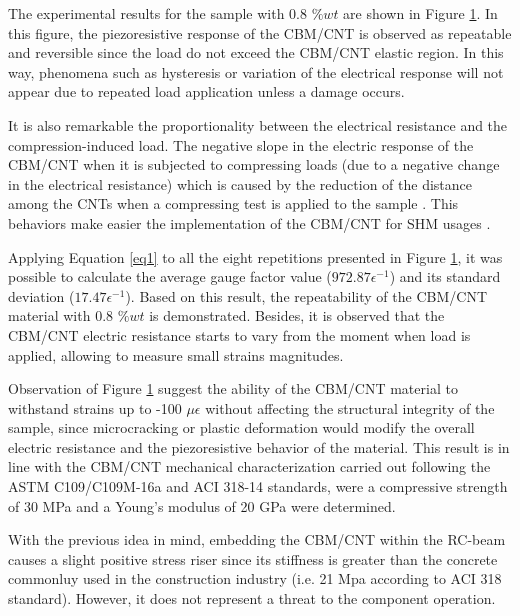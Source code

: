 \documentclass[twocolumn]{bmcart}%
\begin{document}
The experimental results for the sample with 0.8 $\%wt$ are shown in Figure \ref{fig10}. In this figure, the piezoresistive response of the CBM/CNT is observed as repeatable and reversible since the load do not exceed the CBM/CNT elastic region. In this way, phenomena such as hysteresis or variation of the electrical response will not appear due to repeated load application unless a damage occurs.  

It is also remarkable the proportionality between the electrical resistance and the compression-induced load. The negative slope in the electric response of the CBM/CNT when it is subjected to compressing loads (due to a negative change in the electrical resistance) which is caused by the reduction of the distance among the CNTs when a compressing test is applied to the sample \cite{DAlessandro2017}. This behaviors  make easier the implementation of the CBM/CNT for SHM usages \cite{Lagason2016}.


\begin{figure}[h!]
  \caption{
      }
      \label{fig10}
      \end{figure}

Applying Equation \ref{eq1} to all the eight repetitions presented in Figure \ref{fig10}, it was possible to calculate the average gauge factor value ($972.87\epsilon^{-1}$) and its standard deviation  ($17.47 \epsilon^{-1}$). Based on this result, the repeatability of the CBM/CNT material with 0.8 $\%wt$ is demonstrated. Besides, it is observed that the CBM/CNT electric resistance starts to vary from the moment when load is applied, allowing to measure small strains magnitudes.


Observation of Figure \ref{fig10} suggest the ability of the CBM/CNT material to withstand strains up to -100 $\mu \epsilon$  without affecting the structural integrity of the sample, since microcracking or plastic deformation would modify the overall electric resistance and the piezoresistive behavior of the material. This result is in line with the CBM/CNT mechanical characterization carried out following the  ASTM C109/C109M-16a and ACI 318-14 standards, were a compressive strength of 30 MPa and a Young's modulus  of 20 GPa were determined. 

With the previous idea in mind, embedding the CBM/CNT within the RC-beam causes a slight positive stress riser since its stiffness is greater than the concrete commonluy used in the construction industry (i.e. 21 Mpa according to ACI 318 standard). However, it does not represent a threat to the component operation. 
\end{document}
